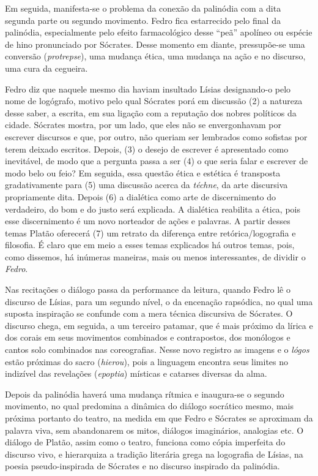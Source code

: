Em seguida, manifesta-se o problema da conexão da palinódia com a dita
segunda parte ou segundo movimento. Fedro fica estarrecido pelo final da
palinódia, especialmente pelo efeito farmacológico desse ``peã''
apolíneo ou espécie de hino pronunciado por Sócrates. Desse momento em
diante, pressupõe-se uma conversão (\emph{protrepse}), uma mudança
ética, uma mudança na ação e no discurso, uma cura da cegueira.

Fedro diz que naquele mesmo dia haviam insultado Lísias designando-o
pelo nome de logógrafo, motivo pelo qual Sócrates porá em discussão (2)
a natureza desse saber, a escrita, em sua ligação com a reputação dos
nobres políticos da cidade. Sócrates mostra, por um lado, que eles não
se envergonhavam por escrever discursos e que, por outro, não queriam
ser lembrados como sofistas por terem deixado escritos. Depois, (3) o
desejo de escrever é apresentado como inevitável, de modo que a pergunta
passa a ser (4) o que seria falar e escrever de modo belo ou feio? Em
seguida, essa questão ética e estética é transposta gradativamente para
(5) uma discussão acerca da \emph{téchne}, da arte discursiva
propriamente dita. Depois (6) a dialética como arte de discernimento do
verdadeiro, do bom e do justo será explicada. A dialética reabilita a
ética, pois esse discernimento é um novo norteador de ações e palavras.
A partir desses temas Platão oferecerá (7) um retrato da diferença entre
retórica/logografia e filosofia. É claro que em meio a esses temas
explicados há outros temas, pois, como dissemos, há inúmeras maneiras,
mais ou menos interessantes, de dividir o \emph{Fedro}.

Nas recitações o diálogo passa da performance da leitura, quando Fedro
lê o discurso de Lísias, para um segundo nível, o da encenação
rapsódica, no qual uma suposta inspiração se confunde com a mera técnica
discursiva de Sócrates. O discurso chega, em seguida, a um terceiro
patamar, que é mais próximo da lírica e dos corais em seus movimentos
combinados e contrapostos, dos monólogos e cantos solo combinados nas
coreografias. Nesse novo registro as imagens e o \emph{lógos} estão
próximas do sacro (\emph{hierou}), pois a linguagem encontra seus
limites no indizível das revelações (\emph{epoptia}) místicas e catarses
diversas da alma.

Depois da palinódia haverá uma mudança rítmica e inaugura-se o segundo
movimento, no qual predomina a dinâmica do diálogo socrático mesmo, mais
próxima portanto do teatro, na medida em que Fedro e Sócrates se
aproximam da palavra viva, sem abandonarem os mitos, diálogos
imaginários, analogias etc. O diálogo de Platão, assim como o teatro,
funciona como cópia imperfeita do discurso vivo, e hierarquiza a
tradição literária grega na logografia de Lísias, na poesia
pseudo-inspirada de Sócrates e no discurso inspirado da palinódia.

